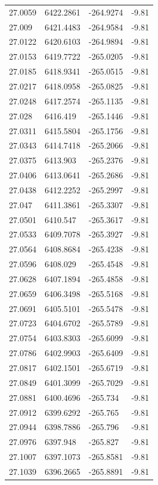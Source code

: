 \begin{table}[H]
\begin{tabular}{llll}
27.0059 & 6422.2861 & -264.9274 & -9.81 \\
27.009 & 6421.4483 & -264.9584 & -9.81 \\
27.0122 & 6420.6103 & -264.9894 & -9.81 \\
27.0153 & 6419.7722 & -265.0205 & -9.81 \\
27.0185 & 6418.9341 & -265.0515 & -9.81 \\
27.0217 & 6418.0958 & -265.0825 & -9.81 \\
27.0248 & 6417.2574 & -265.1135 & -9.81 \\
27.028 & 6416.419 & -265.1446 & -9.81 \\
27.0311 & 6415.5804 & -265.1756 & -9.81 \\
27.0343 & 6414.7418 & -265.2066 & -9.81 \\
27.0375 & 6413.903 & -265.2376 & -9.81 \\
27.0406 & 6413.0641 & -265.2686 & -9.81 \\
27.0438 & 6412.2252 & -265.2997 & -9.81 \\
27.047 & 6411.3861 & -265.3307 & -9.81 \\
27.0501 & 6410.547 & -265.3617 & -9.81 \\
27.0533 & 6409.7078 & -265.3927 & -9.81 \\
27.0564 & 6408.8684 & -265.4238 & -9.81 \\
27.0596 & 6408.029 & -265.4548 & -9.81 \\
27.0628 & 6407.1894 & -265.4858 & -9.81 \\
27.0659 & 6406.3498 & -265.5168 & -9.81 \\
27.0691 & 6405.5101 & -265.5478 & -9.81 \\
27.0723 & 6404.6702 & -265.5789 & -9.81 \\
27.0754 & 6403.8303 & -265.6099 & -9.81 \\
27.0786 & 6402.9903 & -265.6409 & -9.81 \\
27.0817 & 6402.1501 & -265.6719 & -9.81 \\
27.0849 & 6401.3099 & -265.7029 & -9.81 \\
27.0881 & 6400.4696 & -265.734 & -9.81 \\
27.0912 & 6399.6292 & -265.765 & -9.81 \\
27.0944 & 6398.7886 & -265.796 & -9.81 \\
27.0976 & 6397.948 & -265.827 & -9.81 \\
27.1007 & 6397.1073 & -265.8581 & -9.81 \\
27.1039 & 6396.2665 & -265.8891 & -9.81 \\

\end{tabular}
\end{table}
